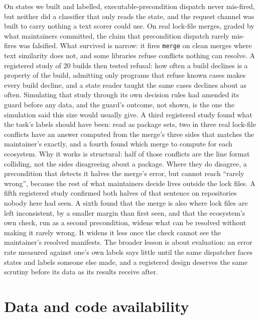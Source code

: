 \documentclass[11pt]{article}
\newcommand{\code}[1]{\texttt{#1}}
\begin{document}
On states we built and labelled, executable-precondition dispatch never mis-fired, but neither
did a classifier that only reads the state, and the request channel was built to carry nothing a
text scorer could use. On real lock-file merges, graded by what maintainers committed, the claim
that precondition dispatch rarely mis-fires was falsified. What survived is narrow: it fires
\code{merge} on clean merges where text similarity does not, and some libraries refuse conflicts
nothing can resolve. A registered study of 20 builds then tested refusal: how often a build
declines is a property of the build, admitting only programs that refuse known cases makes every
build decline, and a state reader taught the same cases declines about as often. Simulating that
study through its own decision rules had amended its guard before any data, and the guard's
outcome, not shown, is the one the simulation said this size would usually give. A third registered study found what the task's labels should have been:
read as package sets, two in three real lock-file conflicts have an answer computed from the
merge's three sides that matches the maintainer's exactly, and a fourth found which merge to
compute for each ecosystem. Why it works is structural: half of those conflicts are the line
format colliding, not the sides disagreeing about a package. Where they do disagree, a
precondition that detects it halves the merge's error, but cannot reach ``rarely wrong'',
because the rest of what maintainers decide lives outside the lock files. A fifth registered
study confirmed both halves of that sentence on repositories nobody here had seen. A sixth found
that the merge is also where lock files are left inconsistent, by a smaller margin than first
seen, and that the ecosystem's own check, run as a second precondition, widens what can be
resolved without making it rarely wrong. It widens it less once the check cannot see the
maintainer's resolved manifests. The broader lesson is about evaluation: an error rate measured
against one's own labels says little until the same dispatcher faces states and labels someone
else made, and a registered design deserves the same scrutiny before its data as its results
receive after.

\section*{Data and code availability}
\end{document}
